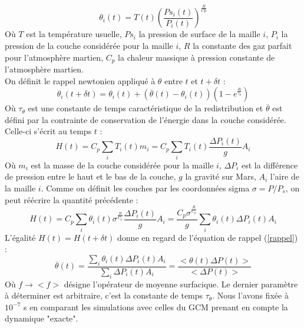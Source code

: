 \documentclass[11pt,a4paper]{article}
\begin{document}
\begin{equation}
\theta_i(t) = T(t)  \left( \frac{Ps_i(t)}{P_i(t)} \right) ^\frac{R}{Cp}
\end{equation}
Où $T$ est la température usuelle, $Ps_i$ la pression de surface de la maille $i$, $P_i$ la pression de la couche considérée pour la maille $i$, $R$ la constante des gaz parfait pour l'atmosphère martien, $C_p$ la chaleur massique à pression constante de l'atmosphère martien. \\
On définit le rappel newtonien appliqué à $\theta$ entre $t$ et $t + \delta t$ :
\begin{equation}
\label{rappel}
\theta_i(t+\delta t) = \theta_i(t) + \left( \overline{\theta}(t) -  \theta_i(t) \right) \left( 1 - e^{\frac{\delta t}{\tau_\theta}} \right)
\end{equation}
Où $\tau_\theta$ est une constante de temps caractéristique de la redistribution et $\overline{\theta}$ est défini par la contrainte de conservation de l'énergie dans la couche considérée. Celle-ci s'écrit au temps $t$ :
\begin{equation}
H(t) = C_p \sum_i T_i(t) m_i = C_p \sum_i T_i(t) \frac{\Delta P_i(t)}{g} A_i
\end{equation}
Où $m_i$ est la masse de la couche considérée pour la maille $i$, $\Delta P_i$ est la différence de pression entre le haut et le bas de la couche, $g$ la gravité sur Mars, $A_i$ l'aire de la maille $i$. Comme on définit les couches par les coordonnées sigma $\sigma = P/P_s$, on peut réécrire la quantité précédente :
\begin{equation}
H(t) = C_p  \sum_i \theta_i(t) \sigma^{\frac{R}{C_p}} \frac{\Delta P_i(t)}{g} A_i = \frac{C_p \sigma^{\frac{R}{C_p}}}{g} \sum_i \theta_i(t) \Delta P_i(t) A_i 
\end{equation}
L'égalité $H(t) = H(t+\delta t)$ donne en regard de l'équation de rappel (\ref{rappel}) :
\begin{equation}
\overline{\theta}(t) = \frac{\sum_i \theta_i(t) \Delta P_i(t) A_i}{\sum_i \Delta P_i(t) A_i} = \frac{ <\theta(t) \Delta P(t)>}{< \Delta P(t) >}
\end{equation}
Où  $f \rightarrow < f >$ désigne l'opérateur de moyenne surfacique. Le dernier paramètre à déterminer est arbitraire, c'est la constante de temps $\tau_\theta$. Nous l'avons fixée à $10^{-7}$ s en comparant les simulations avec celles du GCM prenant en compte la dynamique "exacte". \\
\end{document}
